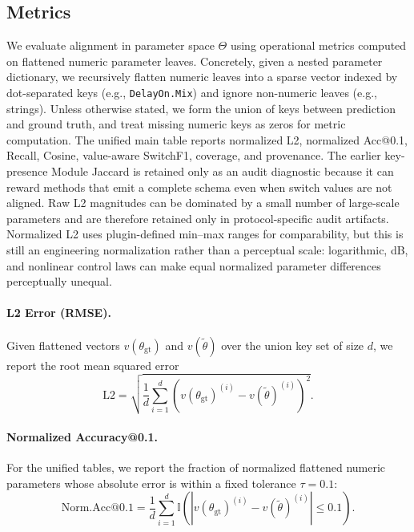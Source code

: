 \subsection{Metrics}
\label{ssec:metrics}
We evaluate alignment in parameter space $\Theta$ using operational metrics computed on flattened numeric parameter leaves. Concretely, given a nested parameter dictionary, we recursively flatten numeric leaves into a sparse vector indexed by dot-separated keys (e.g., \texttt{DelayOn.Mix}) and ignore non-numeric leaves (e.g., strings). Unless otherwise stated, we form the union of keys between prediction and ground truth, and treat missing numeric keys as zeros for metric computation. The unified main table reports normalized L2, normalized Acc@0.1, Recall, Cosine, value-aware SwitchF1, coverage, and provenance. The earlier key-presence Module Jaccard is retained only as an audit diagnostic because it can reward methods that emit a complete schema even when switch values are not aligned. Raw L2 magnitudes can be dominated by a small number of large-scale parameters and are therefore retained only in protocol-specific audit artifacts. Normalized L2 uses plugin-defined min--max ranges for comparability, but this is still an engineering normalization rather than a perceptual scale: logarithmic, dB, and nonlinear control laws can make equal normalized parameter differences perceptually unequal.

\paragraph{L2 Error (RMSE).}
Given flattened vectors $v(\theta_{\text{gt}})$ and $v(\tilde{\theta})$ over the union key set of size $d$, we report the root mean squared error
\begin{equation}
	\text{L2} = \sqrt{\frac{1}{d}\sum_{i=1}^{d}\left(v(\theta_{\text{gt}})^{(i)} - v(\tilde{\theta})^{(i)}\right)^2}.
\end{equation}

\paragraph{Normalized Accuracy@0.1.}
For the unified tables, we report the fraction of normalized flattened numeric parameters whose absolute error is within a fixed tolerance $\tau=0.1$:
\begin{equation}
	\text{Norm.Acc@0.1} = \frac{1}{d}\sum_{i=1}^{d}\mathbb{I}\left(\left|v(\theta_{\text{gt}})^{(i)} - v(\tilde{\theta})^{(i)}\right| \leq 0.1\right).
\end{equation}

